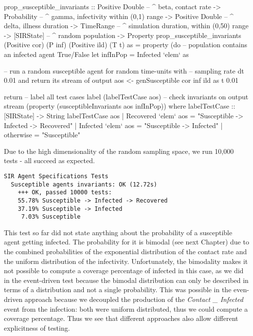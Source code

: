 \begin{HaskellCode}
prop_susceptible_invariants :: Positive Double  -- ^ beta, contact rate
                            -> Probability      -- ^ gamma, infectivity within (0,1) range
                            -> Positive Double  -- ^ delta, illness duration
                            -> TimeRange        -- ^ simulation duration, within (0,50) range
                            -> [SIRState]       -- ^ random population
                            -> Property
prop_susceptible_invariants
      (Positive cor) (P inf) (Positive ild) (T t) as = property (do  
    -- population contains an infected agent True/False
    let infInPop = Infected `elem` as

    -- run a random susceptible agent for random time-units with 
    -- sampling rate dt 0.01 and return its stream of output
    aos <- genSusceptible cor inf ild as t 0.01

    return 
        -- label all test cases
        label (labelTestCase aos) 
        -- check invariants on output stream
        (property (susceptibleInvariants aos infInPop))
  where
    labelTestCase :: [SIRState] -> String
    labelTestCase aos
      | Recovered `elem` aos = "Susceptible -> Infected -> Recovered"
      | Infected `elem` aos  = "Susceptible -> Infected"
      | otherwise            = "Susceptible"
\end{HaskellCode}

Due to the high dimensionality of the random sampling space, we run 10,000 tests - all succeed as expected.

\begin{verbatim}
SIR Agent Specifications Tests
  Susceptible agents invariants: OK (12.72s)
    +++ OK, passed 10000 tests:
    55.78% Susceptible -> Infected -> Recovered
    37.19% Susceptible -> Infected
     7.03% Susceptible
\end{verbatim}

This test so far did not state anything about the probability of a susceptible agent getting infected. The probability for it is bimodal (see next Chapter) due to the combined probabilities of the exponential distribution of the contact rate and the uniform distribution of the infectivity. Unfortunately, the bimodality makes it not possible to compute a coverage percentage of infected in this case, as we did in the event-driven test because the bimodal distribution can only be described in terms of a distribution and not a single probability. This was possible in the even-driven approach because we decoupled the production of the \textit{Contact \_ Infected} event from the infection: both were uniform distributed, thus we could compute a coverage percentage. Thus we see that different approaches also allow different explicitness of testing.


